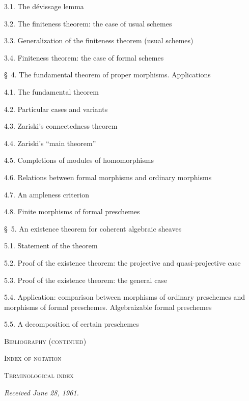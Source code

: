 \begin{flushleft}
3.1. The dévissage lemma 

3.2. The finiteness theorem: the case of usual schemes 

3.3. Generalization of the finiteness theorem (usual schemes) 

3.4. Finiteness theorem: the case of formal schemes 

\medskip
\S~4. The fundamental theorem of proper morphisms. Applications 

4.1. The fundamental theorem 

4.2. Particular cases and variants 

4.3. Zariski's connectedness theorem 

4.4. Zariski's ``main theorem'' 

4.5. Completions of modules of homomorphisms 

4.6. Relations between formal morphisms and ordinary morphisms 

4.7. An ampleness criterion 

4.8. Finite morphisms of formal preschemes 


\S~5. An existence theorem for coherent algebraic sheaves 

5.1. Statement of the theorem 

5.2. Proof of the existence theorem: the projective and quasi-projective case

5.3. Proof of the existence theorem: the general case 

5.4. Application: comparison between morphisms of ordinary preschemes and
morphisms of formal preschemes. Algebraizable formal preschemes 

5.5. A decomposition of certain preschemes 

\medskip
\textsc{Bibliography (continued)} 

\textsc{Index of notation} 

\textsc{Terminological index} 

\begin{flushright}
\emph{Received June 28, 1961.}
\end{flushright}
\end{flushleft}
